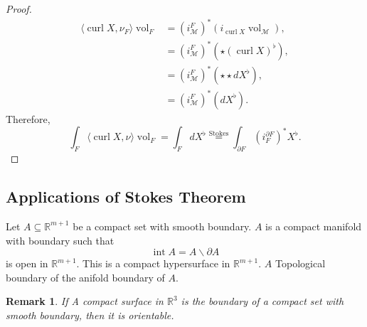 \documentclass[8pt]{article}
\newtheorem{remark}{Remark}[section]
\DeclareMathOperator{\interior}{int}
\DeclareMathOperator{\vol}{vol}
\DeclareMathOperator{\curl}{curl}
\newcommand{\R}[0]{\mathbb{R}}
\newcommand{\M}[0]{\mathcal{M}}
\begin{document}
\begin{proof}
  \begin{align*}
    \langle \curl X,\nu_F\rangle\vol_F & = (i_\M^F)^*(i_{\curl X}\vol_\M),\\
    & = (i_\M^F)^*(\star(\curl X)^\flat),\\
    & = (i_\M^F)^*(\star\star dX^\flat),\\
    & = (i_\M^F)^*(dX^\flat).
  \end{align*}
 Therefore,
 \begin{equation*}
  \int_F\langle\curl X,\nu\rangle \vol_F = \int_FdX^\flat \stackrel{\text{Stokes}}{=}\int_{\partial F}(i_F^{\partial F})^*X^\flat.
 \end{equation*}
\end{proof}


\subsection{Applications of Stokes Theorem}

Let $A\subseteq \R^{m+1}$ be a compact set with smooth boundary. $A$ is a compact manifold with boundary such that  
\begin{equation*}
  \interior A = A\backslash \partial A
\end{equation*}
is open in $\R^{m+1}$. This is a compact hypersurface in $\R^{m+1}$. $A$ Topological boundary of the anifold boundary of $A$. 

\begin{remark}
  If A compact surface in $\R^3$ is the boundary of a compact set with smooth boundary, then it is orientable.
\end{remark}
\end{document}

